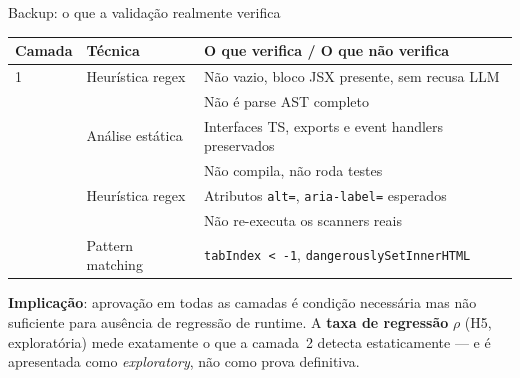 \documentclass[aspectratio=169]{beamer}
\begin{document}
\begin{frame}[noframenumbering]{Backup: o que a validação realmente verifica}
\small
\begin{tabular}{@{}llp{6cm}@{}}
\toprule
\textbf{Camada} & \textbf{Técnica} & \textbf{O que verifica / O que não verifica} \\
\midrule
1 & Heurística regex & Não vazio, bloco JSX presente, sem recusa LLM \\
  &                  & \alert{Não} é parse AST completo \\
\addlinespace
2 & Análise estática & Interfaces TS, exports e event handlers preservados \\
  &                  & \alert{Não} compila, \alert{não} roda testes \\
\addlinespace
3 & Heurística regex & Atributos \texttt{alt=}, \texttt{aria-label=} esperados \\
  &                  & \alert{Não} re-executa os scanners reais \\
\addlinespace
4 & Pattern matching & \texttt{tabIndex < -1}, \texttt{dangerouslySetInnerHTML} \\
\bottomrule
\end{tabular}

\vspace{0.5em}
\small
\textbf{Implicação}: aprovação em todas as camadas é condição necessária
mas não suficiente para ausência de regressão de runtime.
A \textbf{taxa de regressão} $\rho$ (H5, exploratória) mede exatamente
o que a camada~2 detecta estaticamente --- e é apresentada como
\emph{exploratory}, não como prova definitiva.
\end{frame}
\end{document}
